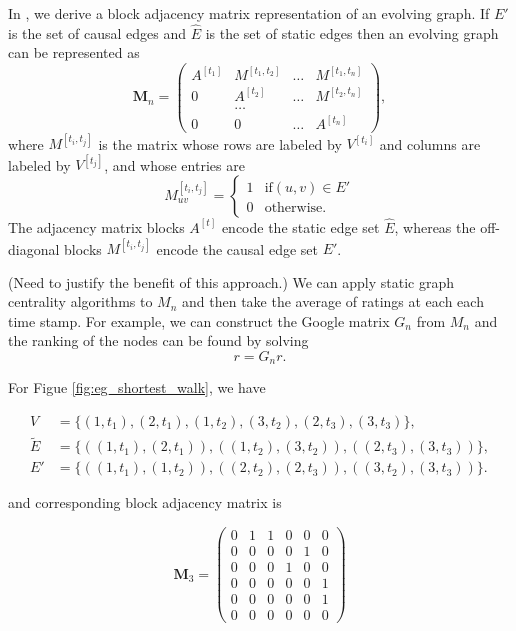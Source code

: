 \documentclass[12pt]{article}
\theoremstyle{definition}
\begin{document}
In \cite{chen16}, we derive a block adjacency matrix representation of an evolving graph.
If $E'$ is the set of causal edges and $\hat E$ is the set of static edges then
an evolving graph can be represented as
$$
\bm M_n =
\begin{pmatrix}
A^{[t_1]} & M^{[t_1, t_2]} & \ldots & M^{[t_1, t_n]} \\
0         & A^{[t_2]} & \ldots & M^{[t_2, t_n]} \\
          & \ldots    &        &     \\
0         & 0         & \ldots & A^{[t_n]}
\end{pmatrix},
$$
where $M^{[t_i, t_j]}$ is the matrix whose rows are labeled by $V^{[t_i]}$ and columns are labeled by $V^{[t_j]}$, and whose entries are
$$
  M_{uv}^{[t_i, t_j]} =
  \begin{cases}
    1 & \mbox{if} (u, v) \in E' \\
    0 & \mbox{otherwise}.
  \end{cases}
$$
The adjacency matrix blocks $A^{[t]}$ encode the static edge set $\hat E$, whereas the off-diagonal blocks $M^{[t_i, t_j]}$ encode the causal edge set $E'$.

(Need to justify the benefit of this approach.)
We can apply static graph centrality algorithms to $M_n$ and then take the average of ratings at each each time stamp. For example, we can construct the Google matrix
$G_n$ from $M_n$ and the ranking of the nodes can be found by solving
$$
 r= G_n r.
$$

For Figue \ref{fig:eg_shortest_walk}, we have

\begin{align*}
V & = \{(1,\!t_1), (2,\!t_1), (1,\!t_2), (3,\!t_2), (2,\!t_3), (3,\!t_3)\},\\
\tilde E &= \{((1,\!t_1), (2,\!t_1)), ((1,\!t_2), (3,\!t_2)), ((2,\!t_3), (3,\!t_3))\},\\
E'  &= \{((1,\!t_1), (1,\!t_2)), ((2,\!t_2), (2,\!t_3)), ((3,\!t_2), (3,\!t_3))\}.
\end{align*}

and corresponding block adjacency matrix is

\[
\bm M_3 = \begin{pmatrix}
0 & 1 & 1 & 0 & 0 & 0 \\
0 & 0 & 0 & 0 & 1 & 0 \\
0 & 0 & 0 & 1 & 0 & 0 \\
0 & 0 & 0 & 0 & 0 & 1 \\
0 & 0 & 0 & 0 & 0 & 1 \\
0 & 0 & 0 & 0 & 0 & 0
\end{pmatrix}
\]
\end{document}
